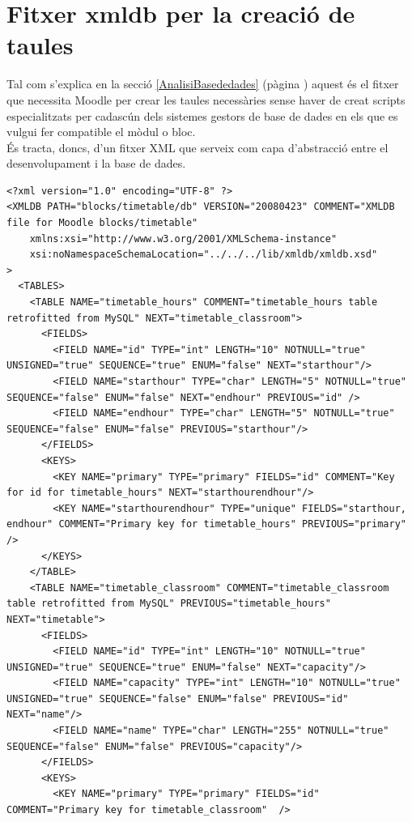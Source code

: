 \documentclass[a4paper]{report}  %
\begin{document}
\section{Fitxer xmldb per la creació de taules}\label{xmldb-rf}
Tal com s'explica en la secció \ref{AnalisiBasededades} (pàgina \pageref{AnalisiBasededades}) aquest és el fitxer que necessita Moodle per crear les taules necessàries sense haver de creat scripts especialitzats per cadascún dels sistemes gestors de base de dades en els que es vulgui fer compatible el mòdul o bloc.\\
És tracta, doncs, d'un fitxer XML que serveix com capa d'abstracció entre el desenvolupament i la base de dades.
\begin{lstlisting}[style=XML, caption=Fitxer xmldb install.xml per la creació de les taules]
<?xml version="1.0" encoding="UTF-8" ?> 
<XMLDB PATH="blocks/timetable/db" VERSION="20080423" COMMENT="XMLDB file for Moodle blocks/timetable" 
    xmlns:xsi="http://www.w3.org/2001/XMLSchema-instance" 
    xsi:noNamespaceSchemaLocation="../../../lib/xmldb/xmldb.xsd" 
> 
  <TABLES> 
    <TABLE NAME="timetable_hours" COMMENT="timetable_hours table retrofitted from MySQL" NEXT="timetable_classroom"> 
      <FIELDS> 
        <FIELD NAME="id" TYPE="int" LENGTH="10" NOTNULL="true" UNSIGNED="true" SEQUENCE="true" ENUM="false" NEXT="starthour"/> 
		<FIELD NAME="starthour" TYPE="char" LENGTH="5" NOTNULL="true" SEQUENCE="false" ENUM="false" NEXT="endhour" PREVIOUS="id" /> 
        <FIELD NAME="endhour" TYPE="char" LENGTH="5" NOTNULL="true" SEQUENCE="false" ENUM="false" PREVIOUS="starthour"/> 
      </FIELDS> 
      <KEYS> 
		<KEY NAME="primary" TYPE="primary" FIELDS="id" COMMENT="Key for id for timetable_hours" NEXT="starthourendhour"/>  
        <KEY NAME="starthourendhour" TYPE="unique" FIELDS="starthour, endhour" COMMENT="Primary key for timetable_hours" PREVIOUS="primary" /> 
      </KEYS> 
    </TABLE> 
    <TABLE NAME="timetable_classroom" COMMENT="timetable_classroom table retrofitted from MySQL" PREVIOUS="timetable_hours" NEXT="timetable"> 
      <FIELDS> 
        <FIELD NAME="id" TYPE="int" LENGTH="10" NOTNULL="true" UNSIGNED="true" SEQUENCE="true" ENUM="false" NEXT="capacity"/> 
        <FIELD NAME="capacity" TYPE="int" LENGTH="10" NOTNULL="true" UNSIGNED="true" SEQUENCE="false" ENUM="false" PREVIOUS="id" NEXT="name"/> 
        <FIELD NAME="name" TYPE="char" LENGTH="255" NOTNULL="true" SEQUENCE="false" ENUM="false" PREVIOUS="capacity"/> 
      </FIELDS> 
      <KEYS> 
        <KEY NAME="primary" TYPE="primary" FIELDS="id" COMMENT="Primary key for timetable_classroom"  /> 

\end{lstlisting}
\end{document}
